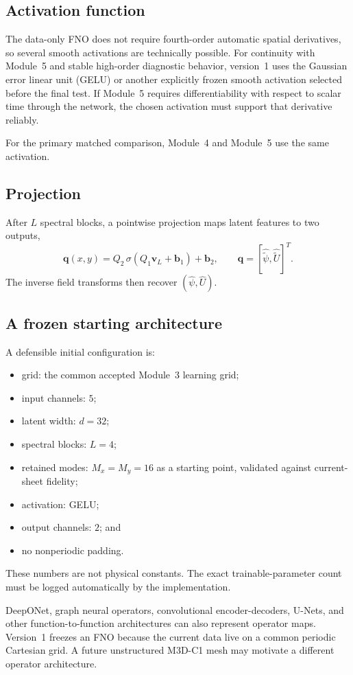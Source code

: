 \documentclass[11pt]{article}
\newcommand{\vect}[1]{\bm{#1}}
\begin{document}
\subsection{Activation function}
The data-only FNO does not require fourth-order automatic spatial derivatives, so several smooth activations are technically possible. For continuity with Module~5 and stable high-order diagnostic behavior, version~1 uses the Gaussian error linear unit (GELU) or another explicitly frozen smooth activation selected before the final test. If Module~5 requires differentiability with respect to scalar time through the network, the chosen activation must support that derivative reliably.

For the primary matched comparison, Module~4 and Module~5 use the same activation.

\subsection{Projection}
After $L$ spectral blocks, a pointwise projection maps latent features to two outputs,
\[
\vect q(x,y)=Q_2\,\sigma(Q_1\vect v_L+\vect b_1)+\vect b_2,
\qquad
\vect q=[\widehat{\widetilde\psi},\widehat{\widetilde U}]^T.
\]
The inverse field transforms then recover $(\widehat\psi,\widehat U)$.

\subsection{A frozen starting architecture}
A defensible initial configuration is:
\begin{itemize}
  \item grid: the common accepted Module~3 learning grid;
  \item input channels: $5$;
  \item latent width: $d=32$;
  \item spectral blocks: $L=4$;
  \item retained modes: $M_x=M_y=16$ as a starting point, validated against current-sheet fidelity;
  \item activation: GELU;
  \item output channels: $2$; and
  \item no nonperiodic padding.
\end{itemize}
These numbers are not physical constants. The exact trainable-parameter count must be logged automatically by the implementation.

\begin{warningbox}
DeepONet, graph neural operators, convolutional encoder-decoders, U-Nets, and other function-to-function architectures can also represent operator maps. Version~1 freezes an FNO because the current data live on a common periodic Cartesian grid. A future unstructured M3D-C1 mesh may motivate a different operator architecture.
\end{warningbox}
\end{document}
